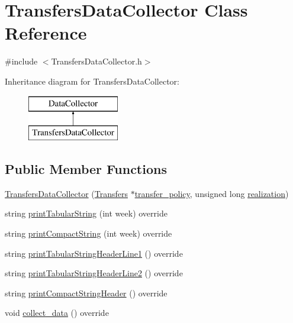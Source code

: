\hypertarget{classTransfersDataCollector}{}\section{Transfers\+Data\+Collector Class Reference}
\label{classTransfersDataCollector}


{\ttfamily \#include $<$Transfers\+Data\+Collector.\+h$>$}

Inheritance diagram for Transfers\+Data\+Collector\+:\begin{figure}[H]
\begin{center}
\leavevmode
\includegraphics[height=2.000000cm]{classTransfersDataCollector}
\end{center}
\end{figure}
\subsection*{Public Member Functions}
\begin{DoxyCompactItemize}
\item 
\mbox{\hyperlink{classTransfersDataCollector_a757289856b49a212a16b6263bfab8b7d_a757289856b49a212a16b6263bfab8b7d}{Transfers\+Data\+Collector}} (\mbox{\hyperlink{classTransfers}{Transfers}} $\ast$\mbox{\hyperlink{classTransfersDataCollector_a9288415ca755018fe2293e7d5913738d_a9288415ca755018fe2293e7d5913738d}{transfer\+\_\+policy}}, unsigned long \mbox{\hyperlink{classDataCollector_a9ef2887466fe3123aa19ef956a219b96_a9ef2887466fe3123aa19ef956a219b96}{realization}})
\item 
string \mbox{\hyperlink{classTransfersDataCollector_a292b907e5c1000d8b3d868409637b9a6_a292b907e5c1000d8b3d868409637b9a6}{print\+Tabular\+String}} (int week) override
\item 
string \mbox{\hyperlink{classTransfersDataCollector_aa5385877143c67a4d300032160239cfe_aa5385877143c67a4d300032160239cfe}{print\+Compact\+String}} (int week) override
\item 
string \mbox{\hyperlink{classTransfersDataCollector_a7c797fbccf4326b206b29529059dd622_a7c797fbccf4326b206b29529059dd622}{print\+Tabular\+String\+Header\+Line1}} () override
\item 
string \mbox{\hyperlink{classTransfersDataCollector_ade6b896383f079d8973076e6b9a8053a_ade6b896383f079d8973076e6b9a8053a}{print\+Tabular\+String\+Header\+Line2}} () override
\item 
string \mbox{\hyperlink{classTransfersDataCollector_a29750b8b76fa82d70d4f472a0e36ceba_a29750b8b76fa82d70d4f472a0e36ceba}{print\+Compact\+String\+Header}} () override
\item 
void \mbox{\hyperlink{classTransfersDataCollector_a2f5c4427699aab547ea0d3b74993752b_a2f5c4427699aab547ea0d3b74993752b}{collect\+\_\+data}} () override
\end{DoxyCompactItemize}
